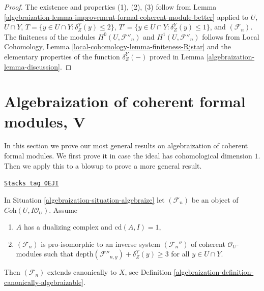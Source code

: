 \begin{proof}

The existence and properties (1), (2), (3) follow from
Lemma \ref{algebraization-lemma-improvement-formal-coherent-module-better} applied
to $U$, $U \cap Y$, $T = \{y \in U \cap Y : \delta^Y_Z(y) \leq 2\}$,
$T' = \{y \in U \cap Y : \delta^Y_Z(y) \leq 1\}$, and $(\mathcal{F}_n)$.
The finiteness of the modules $H^0(U, \mathcal{F}''_n)$ and
$H^1(U, \mathcal{F}''_n)$ follows from
Local Cohomology, Lemma \ref{local-cohomology-lemma-finiteness-Rjstar}
and the elementary properties of the function $\delta^Y_Z(-)$
proved in Lemma \ref{algebraization-lemma-discussion}.
\end{proof}

\section{Algebraization of coherent formal modules, V}
\label{algebraization-section-algebraization-modules-conclusion}
In this section we prove our most general results on algebraization
of coherent formal modules. We first prove it in case
the ideal has cohomological dimension $1$. Then we apply this
to a blowup to prove a more general result.

\begin{lemma}[Cd 1 canonical]
\label{algebraization-lemma-cd-1-canonical}
\href{https://stacks.math.columbia.edu/tag/0EJI}{\texttt{Stacks tag 0EJI}}

In Situation \ref{algebraization-situation-algebraize} let $(\mathcal{F}_n)$
be an object of $\textit{Coh}(U, I\mathcal{O}_U)$. Assume
\begin{enumerate}
\item $A$ has a dualizing complex and $\text{cd}(A, I) = 1$,
\item $(\mathcal{F}_n)$ is pro-isomorphic to an inverse system
$(\mathcal{F}_n'')$ of coherent $\mathcal{O}_U$-modules such that
$\text{depth}(\mathcal{F}''_{n, y}) + \delta^Y_Z(y) \geq 3$
for all $y \in U \cap Y$.
\end{enumerate}
Then $(\mathcal{F}_n)$ extends canonically to $X$, see
Definition \ref{algebraization-definition-canonically-algebraizable}.
\end{lemma}

